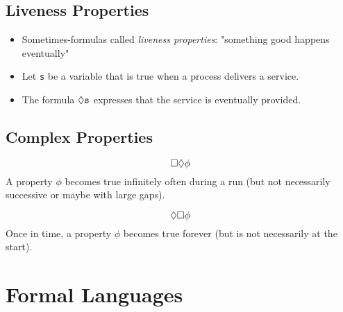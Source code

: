 		\subsection{Liveness Properties}
			\begin{itemize}
				\item Sometimes-formulas called \textit{liveness properties}: "something good happens eventually"
				\item Let \texttt{s} be a variable that is true when a process delivers a service.
				\item The formula \( \lozenge \texttt{s} \) expresses that the service is eventually provided.
			\end{itemize}
		
		\subsection{Complex Properties}
			\begin{equation*}
				\square \lozenge \phi
			\end{equation*}
			A property \(\phi\) becomes true infinitely often during a run (but not necessarily successive or maybe with large gaps).
			
			\begin{equation*}
				\lozenge \square \phi
			\end{equation*}
			Once in time, a property \(\phi\) becomes true forever (but is not necessarily at the start).

	\section{Formal Languages}
		

